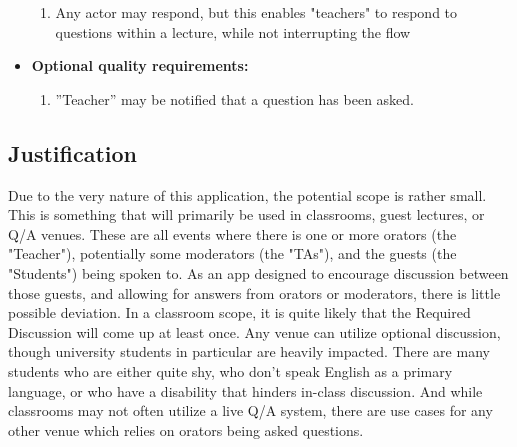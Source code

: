 \documentclass[12pt]{article}
\begin{document}
\begin{itemize}
\begin{enumerate}
            \item Any actor may respond, but this enables "teachers" to respond to questions within a lecture, while not interrupting the flow
        \end{enumerate}
    \item \textbf{Optional quality requirements:}
        \begin{enumerate}
            \item ”Teacher” may be notified that a question has been asked.
        \end{enumerate}
\end{itemize}

\subsection{Justification}
    Due to the very nature of this application, the potential scope is rather small. This is something that will primarily be used in classrooms, guest lectures, or Q/A venues. These are all events where there is one or more orators (the "Teacher"), potentially some moderators (the "TAs"), and the guests (the "Students") being spoken to. As an app designed to encourage discussion between those guests, and allowing for answers from orators or moderators, there is little possible deviation. In a classroom scope, it is quite likely that the Required Discussion will come up at least once. Any venue can utilize optional discussion, though university students in particular are heavily impacted. There are many students who are either quite shy, who don't speak English as a primary language, or who have a disability that hinders in-class discussion. And while classrooms may not often utilize a live Q/A system, there are use cases for any other venue which relies on orators being asked questions.
\end{document}

